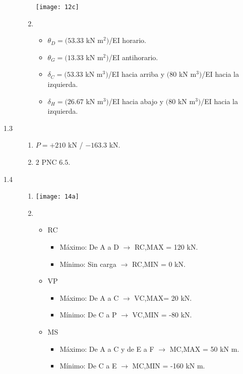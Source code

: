 \begin{description}
\begin{enumerate}[label=\alph*)]
\begin{center}
	\texttt{[image: 12c]}
\end{center}
\addtocounter{enumi}{1}

\item 
\begin{itemize}
\item $\theta_D = (53.33$ kN m$^2)$/EI horario.
\item $ \theta_G = (13.33$ kN m$^2)$/EI antihorario.
\item $ \delta_C = (53.33 $ kN m$^3)$/EI hacia arriba y $(80$ kN m$^3)$/EI hacia la izquierda.
\item  $\delta_H = (26.67$ kN m$^3)$/EI hacia abajo y $(80$ kN m$^3)$/EI hacia la izquierda.
\end{itemize} 
\end{enumerate}

%
\item[1.3]

\begin{enumerate}[label=\alph*)]
	
\item $P = +210$ kN / $- 163.3$ kN.

\item $2$ PNC $6.5$.

\end{enumerate}
\item [1.4]


\begin{enumerate}[label=\alph*)]
	
\item
	
	\begin{center}
		\texttt{[image: 14a]}
	\end{center}
\item 
\begin{itemize}
\item RC
\begin{itemize}
	\item Máximo: De A a D $\rightarrow$ RC,MAX = 120 kN.
    \item Mínimo: Sin carga $\rightarrow$ RC,MIN = 0 kN.
    \end{itemize}
\item VP
\begin{itemize}
	\item Máximo: De A a C $\rightarrow$ VC,MAX= 20 kN.
    \item Mínimo: De C a P $\rightarrow$ VC,MIN = -80 kN.
    \end{itemize}
\item MS
\begin{itemize}
	\item Máximo: De A a C y de E a F $\rightarrow$ MC,MAX = 50 kN m.
   \item Mínimo: De C a E $\rightarrow$ MC,MIN = -160 kN m.
\end{itemize}
\end{itemize}


\end{enumerate}
\end{description}
